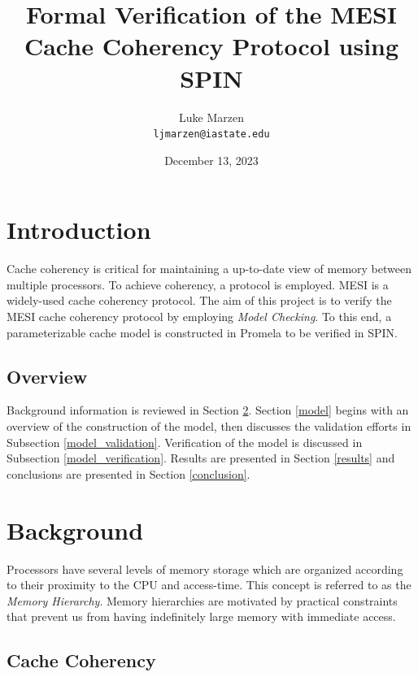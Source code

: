 \documentclass[12pt]{article}
\title{\bf
\large Formal Verification of the MESI Cache Coherency Protocol using SPIN}
\author{Luke Marzen\\
\texttt{ljmarzen@iastate.edu}}
\date{December 13, 2023}
\begin{document}
\maketitle



\section{Introduction}

Cache coherency is critical for maintaining a up-to-date view of memory between multiple processors. To achieve coherency, a protocol is employed. MESI is a widely-used cache coherency protocol. The aim of this project is to verify the MESI cache coherency protocol by employing \textit{Model Checking}. To this end, a parameterizable cache model is constructed in Promela to be verified in SPIN.

\subsection{Overview}

Background information is reviewed in Section \ref{background}. Section \ref{model} begins with an overview of the construction of the model, then discusses the validation efforts in Subsection \ref{model_validation}. Verification of the model is discussed in Subsection \ref{model_verification}. Results are presented in Section \ref{results} and conclusions are presented in Section \ref{conclusion}.

\section{Background} \label{background}

Processors have several levels of memory storage which are organized according to their proximity to the CPU and access-time. This concept is referred to as the \textit{Memory Hierarchy}. Memory hierarchies are motivated by practical constraints that prevent us from having indefinitely large memory with immediate access.

\subsection{Cache Coherency}
\end{document}
